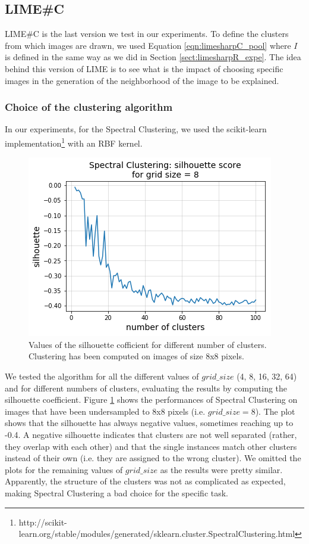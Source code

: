 \documentclass[12pt, twoside, a4paper]{report}
\begin{document}
\subsection{LIME\#C}

LIME\#C is the last version we test in our experiments. To define the clusters from which images are drawn, we used Equation \ref{eqn:limesharpC_pool} where $I$ is defined in the same way as we did in Section \ref{sect:limesharpR_expe}. The idea behind this version of LIME is to see what is the impact of choosing specific images in the generation of the neighborhood of the image to be explained.

\subsubsection{Choice of the clustering algorithm}

In our experiments, for the Spectral Clustering, we used the scikit-learn implementation\footnote{http://scikit-learn.org/stable/modules/generated/sklearn.cluster.SpectralClustering.html} with an RBF kernel.

\begin{figure}
\centering
\includegraphics[width=.8\linewidth]{images/spectral_silhouette.png}
\caption{Values of the silhouette cofficient for different number of clusters. Clustering has been computed on images of size 8x8 pixels.}
\label{fig:spectral-silhouette}
\end{figure}

We tested the algorithm for all the different values of $grid\_size$ (4, 8, 16, 32, 64) and for different numbers of clusters, evaluating the results by computing the silhouette coefficient. Figure \ref{fig:spectral-silhouette} shows the performances of Spectral Clustering on images that have been undersampled to 8x8 pixels (i.e. $grid\_size = 8$). The plot shows that the silhouette has always negative values, sometimes reaching up to -0.4. A negative silhouette indicates that clusters are not well separated (rather, they overlap with each other) and that the single instances match other clusters instead of their own (i.e. they are assigned to the wrong cluster). We omitted the plots for the remaining values of $grid\_size$ as the results were pretty similar. Apparently, the structure of the clusters was not as complicated as expected, making Spectral Clustering a bad choice for the specific task. 
\end{document}
